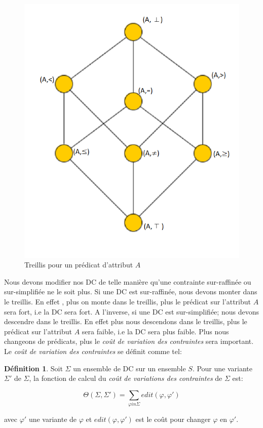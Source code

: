 \documentclass[letterpaper, 12pt]{report}
\theoremstyle{definition}
\newtheorem{mydef}{Définition}
\begin{document}
\begin{figure}
	\centering
	\includegraphics[scale=0.5]{img/treillis}
	\caption{\label{treillis} Treillis pour un prédicat d'attribut $A$}
\end{figure}

Nous devons modifier nos DC de telle manière qu'une contrainte sur-raffinée ou sur-simplifiée ne le soit plus. Si une DC est sur-raffinée, nous devons monter dans le treillis. En effet , plus on monte dans le treillis, plus le prédicat sur l'attribut $A$ sera fort, i.e la DC sera fort. A l'inverse, si une DC est sur-simplifiée; nous devons descendre dans le treillis. En effet plus nous descendons dans le treillis, plus le prédicat sur l'attribut $A$ sera faible, i.e la DC sera plus faible. Plus nous changeons de prédicats, plus le \emph{coût de variation des contraintes} sera important. Le \emph{coût de variation des contraintes} se définit comme tel: 

\begin{mydef}
\label{Thetadef}
Soit $\Sigma$ un ensemble de DC sur un ensemble $S$. Pour une variante $\Sigma '$ de $\Sigma$, la fonction de calcul du \emph{coût de variations des contraintes} de $\Sigma$ est:

$$\Theta (\Sigma,\Sigma ') = \sum_{\varphi in \Sigma} edit(\varphi,\varphi ')$$

\hspace*{2cm} avec $\varphi '$ une variante de $\varphi$ et $edit(\varphi,\varphi ')$ est le coût pour changer $\varphi$ en $\varphi'$.
\end{mydef}
\end{document}
